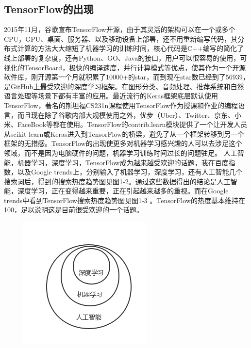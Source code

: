 		\subsection{TensorFlow的出现}	
	2015年11月，谷歌宣布TensorFlow开源，由于其灵活的架构可以在一个或多个CPU，GPU、桌面、服务器、以及移动设备上部署，还不用重新编写代码，其分布式计算的方法大大缩短了机器学习的训练时间，核心代码是C++编写的简化了线上部署的复杂度，还有Python、GO、Java的接口，用户可以很容易的使用，可视化的TensorBoard，极快的编译速度，并行计算模式等优点，使其作为一个开源软件库，刚开源第一个月就积累了10000+的star，而到现在star数已经到了56939，　是GitHub上最受欢迎的深度学习框架。在图形分类、音频处理、推荐系统和自然语言处理等场景下都有丰富的应用。最近流行的Keras框架底层默认使用TensorFlow，著名的斯坦福CS231n课程使用TensorFlow作为授课和作业的编程语言，而且现在除了谷歌内部大规模使用之外，优步（Uber）、Twitter、京东、小米、FaceBook等都在使用。TensorFlow的contrib.learn模块提供了一个让开发人员从scikit-learn或Keras进入到TensorFlow的桥梁，避免了从一个框架转移到另一个框架的无措感。TensorFlow的出现使更多对机器学习感兴趣的人可以去涉足这个领域，而不是因为电脑硬件的问题，机器学习训练时间过长的问题驻足。
	人工智能，机器学习，深度学习，TensorFlow成为越来越受欢迎的话题，我在百度指数，以及Google trends上，分别输入了机器学习，深度学习，还有人工智能几个搜索词后，得到的搜索热度趋势图见图1-2。通过这些数据得出的结论是人工智能，深度学习，正在变得越来重要，正在引起越来越多的重视。而在Google trends中看到TensorFlow搜索热度趋势图见图1-3 。TensorFlow的热度基本维持在100，足以说明这是目前很受欢迎的一个话题。
		\begin{figure}[p]
		\centering
		\includegraphics[width=0.7\linewidth]{figures/1-1}
		\caption[人工智能，机器学习，深度学习三者的关系图]{}
		\caption{}
		\label{fig:1-1}
	\end{figure}
